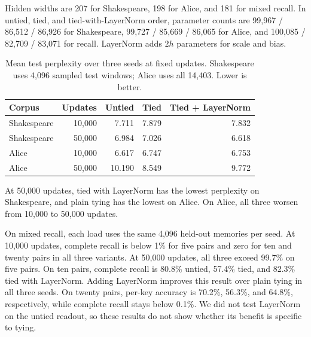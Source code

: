 \documentclass[11pt]{article}
\begin{document}
Hidden widths are 207 for Shakespeare, 198 for Alice, and 181 for mixed recall. In untied, tied, and tied-with-LayerNorm order, parameter counts are 99,967 / 86,512 / 86,926 for Shakespeare, 99,727 / 85,669 / 86,065 for Alice, and 100,085 / 82,709 / 83,071 for recall. LayerNorm adds $2h$ parameters for scale and bias.

\begin{table}[htbp]
\centering\small
\caption{Mean test perplexity over three seeds at fixed updates. Shakespeare uses 4,096 sampled test windows; Alice uses all 14,403. Lower is better.}
\label{tab:weight-tying}
\begin{tabular}{lrrrr}
\toprule
Corpus & Updates & Untied & Tied & Tied + LayerNorm \\
\midrule
Shakespeare & 10,000 & 7.711 & 7.879 & 7.832 \\
Shakespeare & 50,000 & 6.984 & 7.026 & 6.618 \\
Alice       & 10,000 & 6.617 & 6.747 & 6.753 \\
Alice       & 50,000 & 10.190 & 8.549 & 9.772 \\
\bottomrule
\end{tabular}
\end{table}

At 50,000 updates, tied with LayerNorm has the lowest perplexity on Shakespeare, and plain tying has the lowest on Alice. On Alice, all three worsen from 10,000 to 50,000 updates.

On mixed recall, each load uses the same 4,096 held-out memories per seed. At 10,000 updates, complete recall is below 1\% for five pairs and zero for ten and twenty pairs in all three variants. At 50,000 updates, all three exceed 99.7\% on five pairs. On ten pairs, complete recall is 80.8\% untied, 57.4\% tied, and 82.3\% tied with LayerNorm. Adding LayerNorm improves this result over plain tying in all three seeds. On twenty pairs, per-key accuracy is 70.2\%, 56.3\%, and 64.8\%, respectively, while complete recall stays below 0.1\%. We did not test LayerNorm on the untied readout, so these results do not show whether its benefit is specific to tying.
\end{document}
